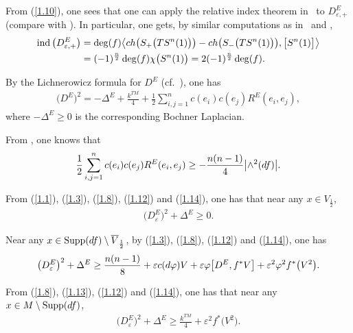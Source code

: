 \documentclass[11pt]{article}
\numberwithin{equation}{section}
\numberwithin{equation}{section}
\theoremstyle{definition}
\begin{document}
 From (\ref{1.10}), one sees that one can apply the relative index theorem in~\cite{GL83} to $D^E_{\varepsilon,+}$ (compare with \cite[Section~6$\frac{4}{5}$]{Gr96}). In particular, one gets, by similar computations as in~\cite{GL83} and \cite[Proposition~III.11.24]{LaMi89},
\begin{align}
\operatorname{ind}\big(D^E_{\varepsilon,+}\big)
&= \deg (f)\big\langle {\rm ch}\big(S_+\big(TS^n(1)\big)\big) -
 {\rm ch}\big(S_-\big(TS^n(1)\big)\big),\big[S^n(1)\big]\big\rangle
\nonumber\\
& =(-1)^{\frac{n}{2}}\deg (f) \chi\big(S^n(1)\big)
 =2(-1)^{\frac{n}{2}}\deg (f) .\label{1.11}
\end{align}

 By the Lichnerowicz formula \cite{L63} for $D^E$ (cf.~\cite{LaMi89}), one has
\begin{gather}\label{1.12}
\big(D^E\big)^2=-\Delta^E+\frac{k^{TM}}{4}+\frac{1}{2}\sum_{i, j=1}^n c (e_i )c (e_j )R^E (e_i,e_j ) ,
\end{gather}
where $-\Delta^E\geq 0$ is the corresponding Bochner Laplacian.

From \cite[equation~(4.6)]{L98}, one knows that
\begin{gather}\label{1.14}
\frac{1}{2}\sum_{i, j=1}^n c (e_i )c (e_j )R^E (e_i,e_j )\geq -\frac{n(n-1)}{4}\big|{\wedge}^2({\rm d}f)\big|.
\end{gather}

From (\ref{1.1}), (\ref{1.3}), (\ref{1.8}), (\ref{1.12}) and (\ref{1.14}), one has that near any $x\in V_{\frac{1}{2}}$,
\begin{gather}\label{1.15}
\big(D_\varepsilon^E\big)^2+\Delta^E \geq0.
\end{gather}

Near any $x\in \operatorname{Supp}({\rm d}f)\setminus \overline{V}_{\frac{1}{2}}$, by
(\ref{1.3}), (\ref{1.8}), (\ref{1.12}) and (\ref{1.14}), one has
\begin{gather}\label{1.16}
\big(D_\varepsilon^E\big)^2+\Delta^E \geq \frac{n(n-1)}{8}+\varepsilon c({\rm d}\varphi)V+\varepsilon \varphi \big[D^E,f^*V\big]+\varepsilon^2\varphi^2f^*\big(V^2\big).
\end{gather}

From (\ref{1.8}), (\ref{1.13}), (\ref{1.12}) and (\ref{1.14}), one has that near any $x\in M\setminus \operatorname{Supp}({\rm d}f)$,
\begin{gather}\label{1.18}
\big(D_\varepsilon^E\big)^2+\Delta^E \geq \frac{k^{TM}}{4}+\varepsilon^2f^*\big(V^2\big).
\end{gather}
\end{document}

